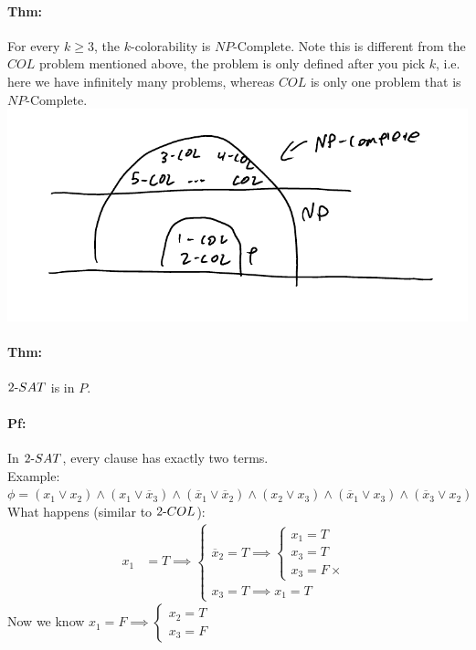\documentclass[12 pt]{article}
\begin{document}
          \paragraph{Thm:} For every $k\geq 3$, the $k$-colorability
          is $NP$-Complete. Note this is different from the $COL$
          problem mentioned above, the problem is only defined after
          you pick $k$, i.e. here we have infinitely many problems,
          whereas $COL$ is only one problem that is $NP$-Complete.
          \\\includegraphics[width=.9\textwidth]{i141.pdf}
          \paragraph{Thm:} $2\hbox{-}SAT$ is in $P$.
          \paragraph{Pf:} In $2\hbox{-}SAT$, every clause has exactly
          two terms.
          \\ Example: $\phi = (x_1 \lor x_2) \land (x_1 \lor
          \overline{x}_3) \land (\overline{x}_1 \lor \overline{x}_2)
          \land (x_2 \lor x_3) \land (\overline{x}_1 \lor x_3) \land
          (\overline{x}_3 \lor x_2)$
          \\ What happens (similar to $2\hbox{-}COL$):
          \begin{align*}
            x_1 & = T \implies
                  \begin{cases}
                    \overline{x}_2 = T \implies
                    \begin{cases}
                      x_1 = T
                      \\ x_3 = T
                      \\ x_3 = F \times
                    \end{cases}
                    \\ x_3 = T \implies x_1 = T
                  \end{cases}
          \end{align*}
          Now we know $x_1 = F \implies
          \begin{cases}
            x_2 = T
            \\ x_3 = F
          \end{cases}
          $
\end{document}
